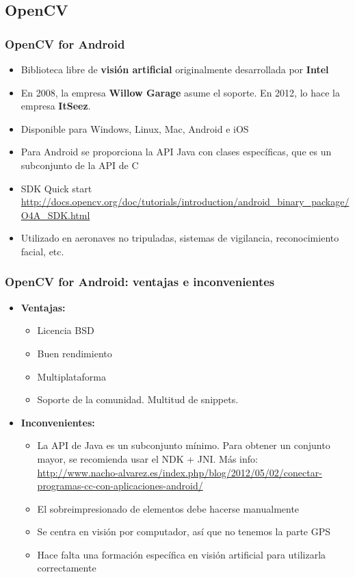 \subsection*{OpenCV}
\frame
{
\frametitle{OpenCV for Android}
\begin{itemize}
 \item Biblioteca libre de \textbf{visión artificial} originalmente desarrollada por \textbf{Intel}
 \item En 2008, la empresa \textbf{Willow Garage} asume el soporte. En 2012, lo hace la empresa \textbf{ItSeez}.
 \item Disponible para Windows, Linux, Mac, Android e iOS
 \item Para Android se proporciona la API Java con clases específicas, que es un subconjunto de la API de C
 \item SDK Quick start\\ \url{http://docs.opencv.org/doc/tutorials/introduction/android_binary_package/O4A_SDK.html}
 \item Utilizado en aeronaves no tripuladas, sistemas de vigilancia, reconocimiento facial, etc.
\end{itemize}
}

\frame
{
\frametitle{OpenCV for Android: ventajas e inconvenientes}
\begin{itemize}
\item \textbf{Ventajas:}
  \begin{itemize}
   \item Licencia BSD
   \item Buen rendimiento
   \item Multiplataforma
   \item Soporte de la comunidad. Multitud de snippets.
  \end{itemize}

\item \textbf{Inconvenientes:}
  \begin{itemize}
   \item La API de Java es un subconjunto mínimo. Para obtener un conjunto mayor, se recomienda usar el NDK + JNI. Más info: \\
     \url{http://www.nacho-alvarez.es/index.php/blog/2012/05/02/conectar-programas-cc-con-aplicaciones-android/}
   \item El sobreimpresionado de elementos debe hacerse manualmente
   \item Se centra en visión por computador, así que no tenemos la parte GPS
   \item Hace falta una formación específica en visión artificial para utilizarla correctamente
  \end{itemize}

\end{itemize}
}

